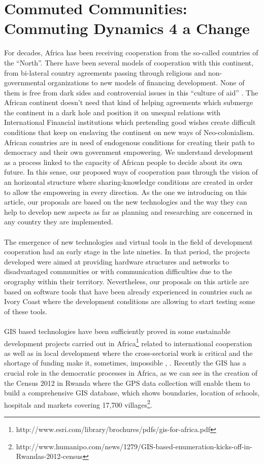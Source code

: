 \newpage

\section{Commuted Communities: Commuting Dynamics 4 a Change}

For decades, Africa has been receiving cooperation from the so-called countries of the “North”. There have been several models of cooperation with this continent, from bi-lateral country agreements passing through religious and non-governmental organizations to new models of financing development. None of them is free from dark sides and controversial issues in this “culture of aid” \citep{moyo2009dead}. The African continent doesn’t need that kind of helping agreements which submerge the continent in a dark hole and position it on unequal relations with International Financial institutions which pretending good wishes create difficult conditions that keep on enslaving the continent on new ways of Neo-colonialism. African countries are in need of endogenous conditions for creating their path to democracy and their own government empowering. We understand development as a process linked to the capacity of African people to decide about its own future\citep{sen2000desarrollo}. In this sense, our proposed ways of cooperation pass through the vision of an horizontal structure where sharing-knowledge conditions are created in order to allow the empowering in every direction. As the one we introducing on this article, our proposals are based on the new technologies and the way they can help to develop new aspects as far as planning and researching are concerned in any country they are implemented.
\\
\\
The emergence of new technologies and virtual tools in the field of development cooperation had an early stage in the late nineties\citep{de2005global}. In that period, the projects developed were aimed at providing hardware structures and networks to disadvantaged communities or with communication difficulties due to the orography within their territory. Nevertheless, our proposals on this article are based on software tools that have been already experienced in countries such as Ivory Coast where the development conditions are allowing to start testing some of these tools.
\\
\\
GIS based technologies have been sufficiently proved in some sustainable development projects carried out in Africa\footnote{http://www.esri.com/library/brochures/pdfs/gis-for-africa.pdf} related to international cooperation as well as in local development where the cross-sectorial work is critical and the shortage of funding make it, sometimes, impossible \citep{mitchell1997zeroing}, \citep{craig2002community}. Recently the GIS has a crucial role in the democratic processes in Africa, as we can see in the creation of the Census 2012 in Rwanda where the GPS data collection will enable them to build a comprehensive GIS database, which shows boundaries, location of schools, hospitals and markets covering 17,700 villages\footnote{http://www.humanipo.com/news/1279/GIS-based-enumeration-kicks-off-in-Rwandas-2012-census}.
